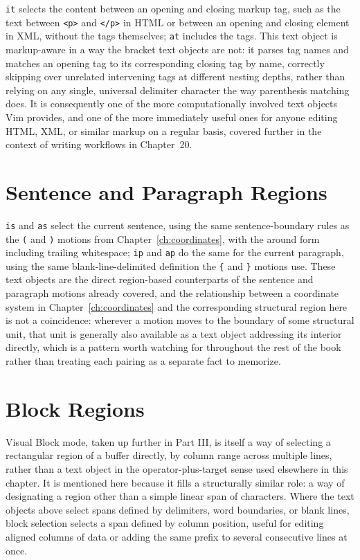\texttt{it} selects the content between an opening and closing markup tag, such as the text between \texttt{<p>} and \texttt{</p>} in HTML or between an opening and closing element in XML, without the tags themselves; \texttt{at} includes the tags. This text object is markup-aware in a way the bracket text objects are not: it parses tag names and matches an opening tag to its corresponding closing tag by name, correctly skipping over unrelated intervening tags at different nesting depths, rather than relying on any single, universal delimiter character the way parenthesis matching does. It is consequently one of the more computationally involved text objects Vim provides, and one of the more immediately useful ones for anyone editing HTML, XML, or similar markup on a regular basis, covered further in the context of writing workflows in Chapter~20.

\section{Sentence and Paragraph Regions}

\texttt{is} and \texttt{as} select the current sentence, using the same sentence-boundary rules as the \texttt{(} and \texttt{)} motions from Chapter~\ref{ch:coordinates}, with the around form including trailing whitespace; \texttt{ip} and \texttt{ap} do the same for the current paragraph, using the same blank-line-delimited definition the \texttt{\{} and \texttt{\}} motions use. These text objects are the direct region-based counterparts of the sentence and paragraph motions already covered, and the relationship between a coordinate system in Chapter~\ref{ch:coordinates} and the corresponding structural region here is not a coincidence: wherever a motion moves to the boundary of some structural unit, that unit is generally also available as a text object addressing its interior directly, which is a pattern worth watching for throughout the rest of the book rather than treating each pairing as a separate fact to memorize.

\section{Block Regions}

Visual Block mode, taken up further in Part III, is itself a way of selecting a rectangular region of a buffer directly, by column range across multiple lines, rather than a text object in the operator-plus-target sense used elsewhere in this chapter. It is mentioned here because it fills a structurally similar role: a way of designating a region other than a simple linear span of characters. Where the text objects above select spans defined by delimiters, word boundaries, or blank lines, block selection selects a span defined by column position, useful for editing aligned columns of data or adding the same prefix to several consecutive lines at once.

